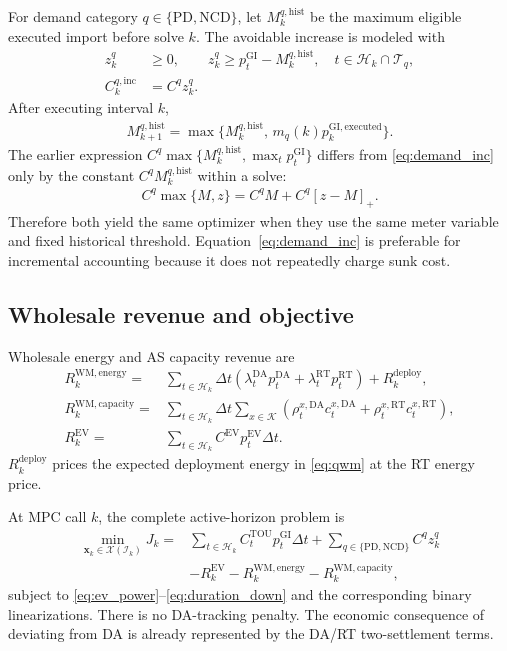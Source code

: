 \documentclass[final,5p,times]{elsarticle}
\newcommand{\dt}{\Delta t}
\newcommand{\EV}{\mathrm{EV}}
\newcommand{\DA}{\mathrm{DA}}
\newcommand{\RT}{\mathrm{RT}}
\newcommand{\GI}{\mathrm{GI}}
\newcommand{\TOU}{\mathrm{TOU}}
\newcommand{\PD}{\mathrm{PD}}
\newcommand{\NCD}{\mathrm{NCD}}
\newcommand{\WM}{\mathrm{WM}}
\newcommand{\hist}{\mathrm{hist}}
\newcommand{\calT}{\mathcal{T}}
\newcommand{\calH}{\mathcal{H}}
\newcommand{\calK}{\mathcal{K}}
\newcommand{\pos}[1]{\left[#1\right]_{+}}
\begin{document}
For demand category $q\in\{\PD,\NCD\}$, let $M_k^{q,\hist}$ be the maximum
eligible executed import before solve $k$. The avoidable increase is modeled
with
\begin{align}
z_k^q&\ge0, \qquad
z_k^q\ge p_t^{\GI}-M_k^{q,\hist},
\quad t\in\calH_k\cap\calT_q, \label{eq:demand_epi}\\
C_k^{q,\mathrm{inc}}&=C^q z_k^q. \label{eq:demand_inc}
\end{align}
After executing interval $k$,
\begin{align}
M_{k+1}^{q,\hist}
=\max\{M_k^{q,\hist},\,m_q(k)p_k^{\GI,\mathrm{executed}}\}. \label{eq:threshold_update}
\end{align}
The earlier expression $C^q\max\{M_k^{q,\hist},\max_t p_t^{\GI}\}$ differs from
\eqref{eq:demand_inc} only by the constant $C^qM_k^{q,\hist}$ within a solve:
\begin{align}
C^q\max\{M,z\}=C^qM+C^q\pos{z-M}. \label{eq:demand_equivalence}
\end{align}
Therefore both yield the same optimizer when they use the same meter variable
and fixed historical threshold. Equation~\eqref{eq:demand_inc} is preferable
for incremental accounting because it does not repeatedly charge sunk cost.

\subsection{Wholesale revenue and objective}
Wholesale energy and AS capacity revenue are
\begin{align}
R_k^{\WM,\mathrm{energy}}
={}&\sum_{t\in\calH_k}\dt
\left(\lambda_t^{\DA}p_t^{\DA}
+\lambda_t^{\RT}p_t^{\RT}\right)+R_k^{\mathrm{deploy}}, \label{eq:wm_energy}\\
R_k^{\WM,\mathrm{capacity}}
={}&\sum_{t\in\calH_k}\dt\sum_{x\in\calK}
\left(\rho_t^{x,\DA}c_t^{x,\DA}
+\rho_t^{x,\RT}c_t^{x,\RT}\right), \label{eq:wm_capacity}\\
R_k^{\EV}
={}&\sum_{t\in\calH_k}C^{\EV}p_t^{\EV}\dt. \label{eq:ev_revenue}
\end{align}
$R_k^{\mathrm{deploy}}$ prices the expected deployment energy in
\eqref{eq:qwm} at the RT energy price.

At MPC call $k$, the complete active-horizon problem is
\begin{align}
\min_{\boldsymbol{x}_k\in\mathcal{X}(\mathcal{I}_k)}
J_k={}&
\sum_{t\in\calH_k}C_t^{\TOU}p_t^{\GI}\dt
+\sum_{q\in\{\PD,\NCD\}}C^qz_k^q \nonumber\\
&-R_k^{\EV}
-R_k^{\WM,\mathrm{energy}}
-R_k^{\WM,\mathrm{capacity}}, \label{eq:objective}
\end{align}
subject to \eqref{eq:ev_power}--\eqref{eq:duration_down} and the corresponding
binary linearizations. There is no DA-tracking penalty. The economic
consequence of deviating from DA is already represented by the DA/RT
two-settlement terms.
\end{document}
